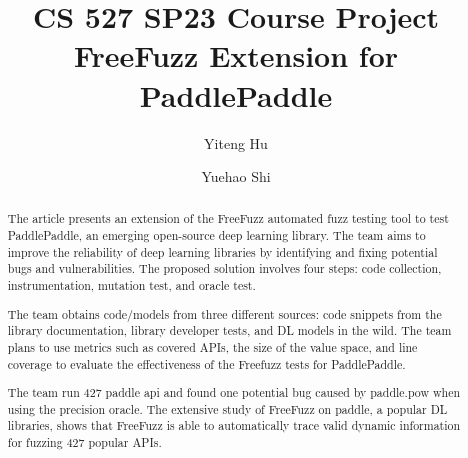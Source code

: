 \documentclass[sigconf]{acmart}
\begin{document}
\title{CS 527 SP23 Course Project \\ FreeFuzz Extension for PaddlePaddle}
\author{Yiteng Hu}
\author{Yuehao Shi}
\authornotemark[1]

\renewcommand{\shortauthors}{Hu and Shi, et al.}

\begin{abstract}
  The article presents an extension of the FreeFuzz automated fuzz testing tool to test PaddlePaddle, 
  an emerging open-source deep learning library. The team aims to improve the reliability of deep learning 
  libraries by identifying and fixing potential bugs and vulnerabilities. The proposed solution involves 
  four steps: code collection, instrumentation, mutation test, and oracle test. 

  The team obtains code/models from three different sources: code snippets from the
library documentation, library developer tests, and  DL models
in the wild.
  The team plans to use metrics such as covered APIs, the size of the value space, and line coverage to evaluate the effectiveness 
  of the Freefuzz tests for PaddlePaddle.

  The team run 427 paddle api and found one potential bug caused by paddle.pow when using the precision oracle.
  The extensive study of FreeFuzz on paddle, a popular DL libraries, shows that FreeFuzz is able to automatically trace valid
  dynamic information for fuzzing 427 popular APIs.
\end{abstract}

\end{document}
